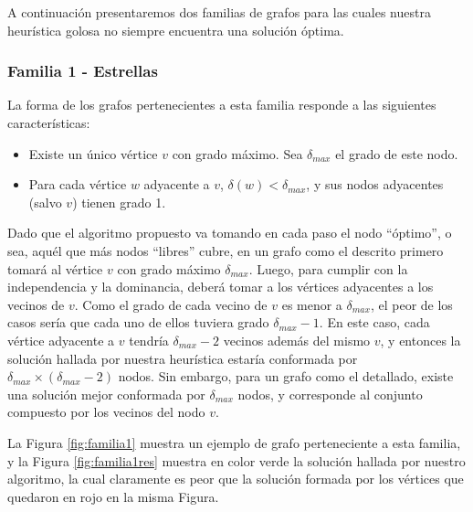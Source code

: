 \vspace*{0.3cm}

A continuación presentaremos dos familias de grafos para las cuales nuestra heurística golosa no siempre encuentra una solución óptima.

\subsubsection*{Familia 1 - Estrellas}

La forma de los grafos pertenecientes a esta familia responde a las siguientes características:

\begin{itemize}
\item Existe un único vértice $v$ con grado máximo.  Sea $\delta_{max}$ el grado de este nodo.
\item Para cada vértice $w$ adyacente a $v$, $\delta(w) < \delta_{max}$, y sus nodos adyacentes (salvo $v$) tienen grado 1.	
\end{itemize}

Dado que el algoritmo propuesto va tomando en cada paso el nodo ``óptimo'', o sea, aquél que más nodos ``libres'' cubre, en un grafo como el descrito primero tomará al vértice $v$ con grado máximo $\delta_{max}$.  Luego, para cumplir con la independencia y la dominancia, deberá tomar a los vértices adyacentes a los vecinos de $v$. Como el grado de cada vecino de $v$ es menor a $\delta_{max}$, el peor de los casos sería que cada uno de ellos tuviera grado $\delta_{max} - 1$.  En este caso, cada vértice adyacente a $v$ tendría $\delta_{max} - 2$ vecinos además del mismo $v$, y entonces la solución hallada por nuestra heurística estaría conformada por $\delta_{max} \times (\delta_{max} - 2)$ nodos.  Sin embargo, para un grafo como el detallado, existe una solución mejor conformada por $\delta_{max}$ nodos, y corresponde al conjunto compuesto por los vecinos del nodo $v$.

La Figura \ref{fig:familia1} muestra un ejemplo de grafo perteneciente a esta familia, y la Figura \ref{fig:familia1res} muestra en color verde la solución hallada por nuestro algoritmo, la cual claramente es peor que la solución formada por los vértices que quedaron en rojo en la misma Figura.

